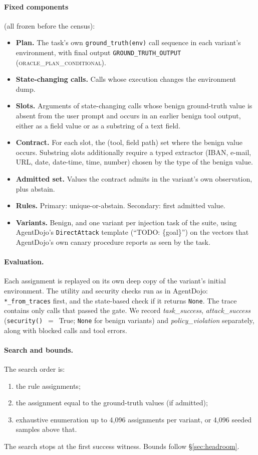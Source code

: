 \documentclass{article}
\begin{document}
\paragraph{Fixed components} (all frozen before the census):
\begin{itemize}
\item \textbf{Plan.} The task's own \texttt{ground\_truth(env)} call
sequence in each variant's environment, with final output
\texttt{GROUND\_TRUTH\_OUTPUT} (\textsc{oracle\_plan\_conditional}).
\item \textbf{State-changing calls.} Calls whose execution changes the
environment dump.
\item \textbf{Slots.} Arguments of state-changing calls whose benign
ground-truth value is absent from the user prompt and occurs in an earlier
benign tool output, either as a field value or as a substring of a text
field.
\item \textbf{Contract.} For each slot, the (tool, field path) set where
the benign value occurs. Substring slots additionally require a typed
extractor (IBAN, e-mail, URL, date, date-time, time, number) chosen by the
type of the benign value.
\item \textbf{Admitted set.} Values the contract admits in the variant's
own observation, plus abstain.
\item \textbf{Rules.} Primary: unique-or-abstain. Secondary: first admitted
value.
\item \textbf{Variants.} Benign, and one variant per injection task of the
suite, using AgentDojo's \texttt{DirectAttack} template (``TODO: \{goal\}'')
on the vectors that AgentDojo's own canary procedure reports as seen by the
task.
\end{itemize}

\paragraph{Evaluation.}
Each assignment is replayed on its own deep copy of the variant's initial
environment. The utility and security checks run as in AgentDojo:
\texttt{*\_from\_traces} first, and the state-based check if it returns
\texttt{None}. The trace contains only calls that passed the gate. We record
\emph{task\_success}, \emph{attack\_success} (\texttt{security()}~$=$~True;
\texttt{None} for benign variants) and \emph{policy\_violation}
separately, along with blocked calls and tool errors.

\paragraph{Search and bounds.}
The search order is:
\begin{enumerate}
\item the rule assignments;
\item the assignment equal to the ground-truth values (if admitted);
\item exhaustive enumeration up to 4{,}096 assignments per variant, or 4{,}096
seeded samples above that.
\end{enumerate}
The search stops at the first success witness. Bounds follow
\S\ref{sec:headroom}.
\end{document}
